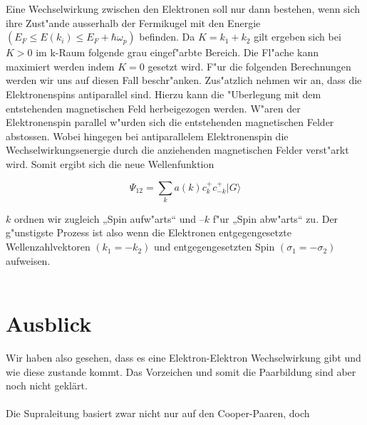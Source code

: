 \begin{refsection}
Eine Wechselwirkung zwischen den Elektronen soll nur dann bestehen, wenn sich ihre Zust"ande ausserhalb der Fermikugel mit den Energie $(E_F \le E(k_i) \le E_F+\hbar\omega_p)$ befinden. Da $K=k_1+k_2$ gilt ergeben sich bei $K>0$ im k-Raum folgende grau eingef"arbte Bereich. Die Fl"ache kann maximiert werden indem $K=0$ gesetzt wird. F"ur die folgenden Berechnungen werden wir uns auf diesen Fall beschr"anken.
Zus"atzlich nehmen wir an, dass die Elektronenspins antiparallel sind. Hierzu kann die "Uberlegung mit dem entstehenden magnetischen Feld herbeigezogen werden. W"aren der Elektronenspin parallel w"urden sich die entstehenden magnetischen Felder abstossen. Wobei hingegen bei antiparallelem Elektronenspin die Wechselwirkungsenergie durch die anziehenden magnetischen Felder verst"arkt wird.
Somit ergibt sich die neue Wellenfunktion

\[
\Psi_{12}=\sum \limits_{k} a(k)c^+_{k}c^+_{-k}|G\rangle
\]

$k$ ordnen wir zugleich „Spin aufw"arts“ und $–k$ f"ur „Spin abw"arts“ zu.
Der g"unstigste Prozess ist also wenn die Elektronen entgegengesetzte Wellenzahlvektoren $(k_1 = -k_2)$ und entgegengesetzten Spin $(\sigma_1 = -\sigma_2)$ aufweisen.
\\
\\

\section{Ausblick}
Wir haben also gesehen, dass es eine Elektron-Elektron Wechselwirkung gibt und wie diese zustande kommt. Das Vorzeichen und somit die Paarbildung sind aber noch nicht geklärt.
\\%
\\
Die Supraleitung basiert zwar nicht nur auf den Cooper-Paaren, doch 


\printbibliography[heading=subbibliography]
\end{refsection}



